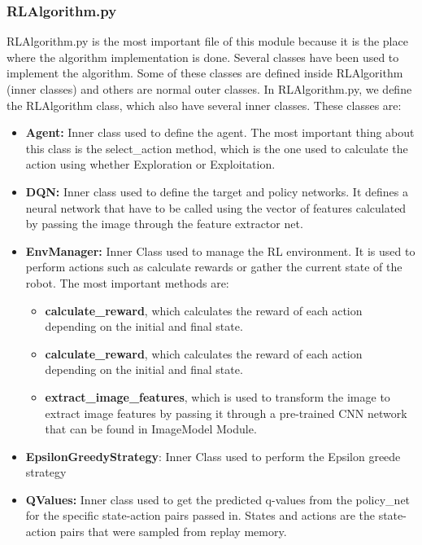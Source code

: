 			\subsubsection{RLAlgorithm.py}
				RLAlgorithm.py is the most important file of this module because it is the place where the algorithm implementation is done. Several classes have been used to implement the algorithm. Some of these classes are defined inside RLAlgorithm (inner classes) and others are normal outer classes.				
				In RLAlgorithm.py, we define the RLAlgorithm class, which also have several inner classes. These classes are:
				
				\begin{itemize}
					\item[\textendash]\textbf{Agent:} Inner class used to define the agent. The most important thing about this class is the select\_action method, which is the one used to calculate the action using whether Exploration or Exploitation.
					\item[\textendash]\textbf{DQN:} Inner class used to define the target and policy networks. It defines a neural network that have to be called using the vector of features calculated by passing the image through the feature extractor net.
					\item[\textendash]\textbf{EnvManager:} Inner Class used to manage the RL environment. It is used to perform actions such as calculate rewards or gather the current state of the robot. The most important methods are:
					\begin{itemize}
						\item[\textendash]\textbf{calculate\_reward}, which calculates the reward of each action depending on the initial and final state.
						\item[\textendash]\textbf{calculate\_reward}, which calculates the reward of each action depending on the initial and final state.
						\item[\textendash]\textbf{extract\_image\_features}, which is used to transform the image to extract image features by passing it through a pre-trained CNN network that can be found in ImageModel Module.
					\end{itemize}
					\item[\textendash]\textbf{EpsilonGreedyStrategy}: Inner Class used to perform the Epsilon greede strategy
					\item[\textendash]\textbf{QValues:} Inner class used to get the predicted q-values from the policy\_net for the specific state-action pairs passed in. States and actions are the state-action pairs that were sampled from replay memory.

\end{itemize}
